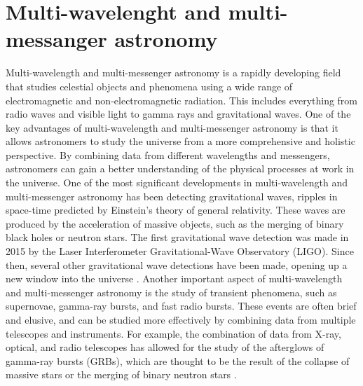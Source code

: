 \section{Multi-wavelenght and multi-messanger astronomy}
Multi-wavelength and multi-messenger astronomy is a rapidly developing field that studies celestial objects and phenomena using a wide range of electromagnetic and non-electromagnetic radiation. This includes everything from radio waves and visible light to gamma rays and gravitational waves.
One of the key advantages of multi-wavelength and multi-messenger astronomy is that it allows astronomers to study the universe from a more comprehensive and holistic perspective. By combining data from different wavelengths and messengers, astronomers can gain a better understanding of the physical processes at work in the universe.
One of the most significant developments in multi-wavelength and multi-messenger astronomy has been detecting gravitational waves, ripples in space-time predicted by Einstein's theory of general relativity. These waves are produced by the acceleration of massive objects, such as the merging of binary black holes or neutron stars. The first gravitational wave detection was made in 2015 by the Laser Interferometer Gravitational-Wave Observatory (LIGO). Since then, several other gravitational wave detections have been made, opening up a new window into the universe \cite{abbott2016observation}.
Another important aspect of multi-wavelength and multi-messenger astronomy is the study of transient phenomena, such as supernovae, gamma-ray bursts, and fast radio bursts. These events are often brief and elusive, and can be studied more effectively by combining data from multiple telescopes and instruments. For example, the combination of data from X-ray, optical, and radio telescopes has allowed for the study of the afterglows of gamma-ray bursts (GRBs), which are thought to be the result of the collapse of massive stars or the merging of binary neutron stars \cite{Fishman1995}.

